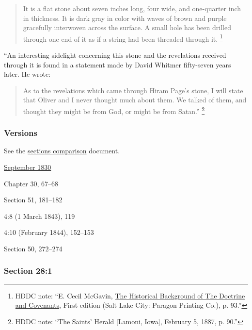 					\begin{quote}
						It is a flat stone about seven inches long, four wide, and one-quarter inch in thickness. It is dark gray in color with waves of brown and purple gracefully interwoven across the surface. A small hole has been drilled through one end of it as if a string had been threaded through it.%
							\footnote{%
								HDDC note: ``E. Cecil McGavin, \uline{The Historical Background of The Doctrine and Covenants}, First edition (Salt Lake City: Paragon Printing Co.), p. 93.''
								}
					\end{quote}
					
				``An interesting sidelight concerning this stone and the revelations received through it is found in a statement made by David Whitmer fifty-seven years later. He wrote:
				
					\begin{quote}
						As to the revelations which came through Hiram Page's stone, I will state that Oliver and I never thought much about them. We talked of them, and thought they might be from God, or might be from Satan.''%
						\footnote{%
							HDDC note: ``The Saints' Herald [Lamoni, Iowa], February 5, 1887, p. 90.''
							} 
					\end{quote}
			
	\subsubsection{Versions}
		\label{DC28-V}
		
		See the \href{https://drive.google.com/file/d/1goAvNz8jS4R8slYfMG_db55Ty2z_vmgK/view?usp=sharing}{sections comparison} document.
	
		\begin{compactdesc}
			\item[JSP] \hyperref[EMS-1830-JS-SEP-1830-B]{September 1830}
			\item[BC] Chapter 30, 67--68
			\item[DC 1835] Section 51, 181--182
			\item[TS] 4:8 (1 March 1843), 119
			\item[MS] 4:10 (February 1844), 152--153
			\item[DC 1844] Section 50, 272--274
		\end{compactdesc}

	\subsubsection{Section 28:1} %
		\label{DC28-1}

